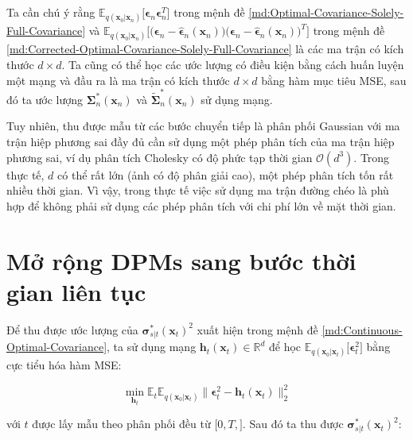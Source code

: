 \documentclass[14pt, a4paper]{article}
\numberwithin{equation}{section}
\numberwithin{figure}{section}
\numberwithin{dl}{section}
\numberwithin{md}{section}
\numberwithin{bd}{section}
\numberwithin{dn}{section}
\numberwithin{hq}{section}
\begin{document}
    Ta cần chú ý rằng $\mathbb{E}_{q(\boldsymbol{x}_0 \vert \boldsymbol{x}_n)} \lbrack \boldsymbol{\epsilon}_n \boldsymbol{\epsilon}_n^T \rbrack$ trong mệnh đề \ref{md:Optimal-Covariance-Solely-Full-Covariance} và $\mathbb{E}_{q(\boldsymbol{x}_0 \vert \boldsymbol{x}_n)} \big \lbrack \big( \boldsymbol{\epsilon}_n - \hat{\boldsymbol{\epsilon}}_n (\boldsymbol{x}_n) \big) \big( \boldsymbol{\epsilon}_n - \hat{\boldsymbol{\epsilon}}_n (\boldsymbol{x}_n) \big)^T \big \rbrack$ trong mệnh đề \ref{md:Corrected-Optimal-Covariance-Solely-Full-Covariance} là các ma trận có kích thước $d\times d$.
    Ta cũng có thể học các ước lượng có điều kiện bằng cách huấn luyện một mạng và đầu ra là ma trận có kích thước $d \times d$ bằng hàm mục tiêu MSE, sau đó ta ước lượng $\boldsymbol{\Sigma}_n^{\ast} (\boldsymbol{x}_n)$ và $\tilde{\boldsymbol{\Sigma}}_n^{\ast} (\boldsymbol{x}_n)$ sử dụng mạng.

    Tuy nhiên, thu được mẫu từ các bước chuyển tiếp là phân phối Gaussian với ma trận hiệp phương sai đầy đủ cần sử dụng một phép phân tích của ma trận hiệp phương sai, ví dụ phân tích Cholesky có độ phức tạp thời gian $\mathcal{O}(d^3)$.
    Trong thực tế, $d$ có thể rất lớn (ảnh có độ phân giải cao), một phép phân tích tốn rất nhiều thời gian.
    Vì vậy, trong thực tế việc sử dụng ma trận đường chéo là phù hợp để không phải sử dụng các phép phân tích với chi phí lớn về mặt thời gian.

    \section{Mở rộng DPMs sang bước thời gian liên tục}

    Để thu được ước lượng của $\boldsymbol{\sigma}_{s \vert t}^{\ast} (\boldsymbol{x}_t)^2$ xuất hiện trong mệnh đề \ref{md:Continuous-Optimal-Covariance}, ta sử dụng mạng $\boldsymbol{h}_t (\boldsymbol{x}_t) \in \mathbb{R}^d$ để học $\mathbb{E}_{q(\boldsymbol{x}_0 \vert \boldsymbol{x}_t)} \lbrack \boldsymbol{\epsilon}_t^2 \rbrack$ bằng cực tiểu hóa hàm MSE:

    \begin{equation}
        \min_{\boldsymbol{h}_t} \mathbb{E}_t \mathbb{E}_{q(\boldsymbol{x}_0 \vert \boldsymbol{x}_t)} \lVert \boldsymbol{\epsilon}_t^2 - \boldsymbol{h}_t (\boldsymbol{x}_t) \rVert_2^2
    \end{equation}

    với $t$ được lấy mẫu theo phân phối đều từ $\lbrack 0, T, \rbrack$. Sau đó ta thu được $\boldsymbol{\sigma}_{s \vert t}^{\ast} (\boldsymbol{x}_t)^2$:
\end{document}
